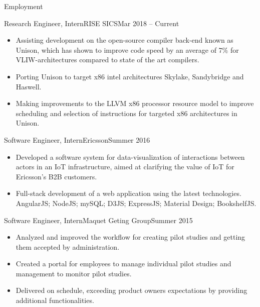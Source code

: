 \documentclass[]{mcdowellcv}
\begin{document}
\makeheader

\begin{cvsection}{Employment}
    \begin{cvsubsection}{Research Engineer, Intern}{RISE SICS}{Mar 2018 -- Current}
        \begin{itemize}
            \item Assisting development on the open-source compiler back-end known as Unison, which has shown to improve code speed by an average of 7\% for VLIW-architectures compared to state of the art compilers.
            \item Porting Unison to target x86 intel architectures Skylake, Sandybridge and Haswell.
            \item Making improvements to the LLVM x86 processor resource model to improve scheduling and selection of instructions for targeted x86 architectures in Unison.
        \end{itemize}
    \end{cvsubsection}

    \begin{cvsubsection}{Software Engineer, Intern}{Ericsson}{Summer 2016}	
        \begin{itemize}
            \item Developed a software system for data-visualization of interactions between actors in an IoT infrastructure, aimed at clarifying the value of IoT for Ericsson's B2B customers.
            \item Full-stack development of a web application using the latest technologies. AngularJS; NodeJS; mySQL; D3JS; ExpressJS; Material Design; BookshelfJS.
        \end{itemize}
    \end{cvsubsection}

    \begin{cvsubsection}{Software Engineer, Intern}{Maquet Geting Group}{Summer 2015}		
        \begin{itemize}
            \item Analyzed and improved the workflow for creating pilot studies and getting them accepted by administration.
            \item Created a portal for employees to manage individual pilot studies and management to monitor pilot studies.
            \item Delivered on schedule, exceeding product owners expectations by providing additional functionalities.
        \end{itemize}
    \end{cvsubsection}
\end{cvsection}
\end{document}
